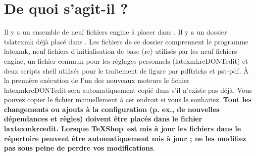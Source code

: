 \documentclass[11pt,french]{article}
\newcommand{\TS}{\textsf{\TeX Shop}}
\newcommand{\cmd}[1]{\textsf{#1}}
\begin{document}
\section{De quoi s'agit-il ?}

Il y a un ensemble de neuf fichiers \cmd{engine} à placer dans . Il y a un dossier \cmd{tslatexmk} déjà placé dans . Les fichiers de ce dossier comprennent le programme \cmd{latexmk}, neuf fichiers d'initialisation de base (\cmd{rc}) utilisés par les neuf fichiers \cmd{engine}, un fichier commun pour les réglages personnels (\cmd{latexmkrcDONTedit}) et deux scripts shell utilisés pour le traitement de figure par \cmd{pdftricks} et \cmd{pst-pdf}. À la première exécution de l'un des nouveaux moteurs le fichier \cmd{latexmkrcDONTedit} sera automatiquement copié dans  s'il  n'existe pas déjà. Vous pouvez copier le fichier manuellement à cet endroit si vous le souhaitez. \textbf{Tout les changements ou ajouts à la configuration (p. ex., de nouvelles dépendances et règles) doivent être placés dans le fichier \cmd{laxtexmkrcedit}. Lorsque \TS\ est mis à jour les fichiers dans le répertoire  peuvent être automatiquement mis à jour ; ne les modifiez pas sous peine de perdre vos modifications}.
\end{document}
